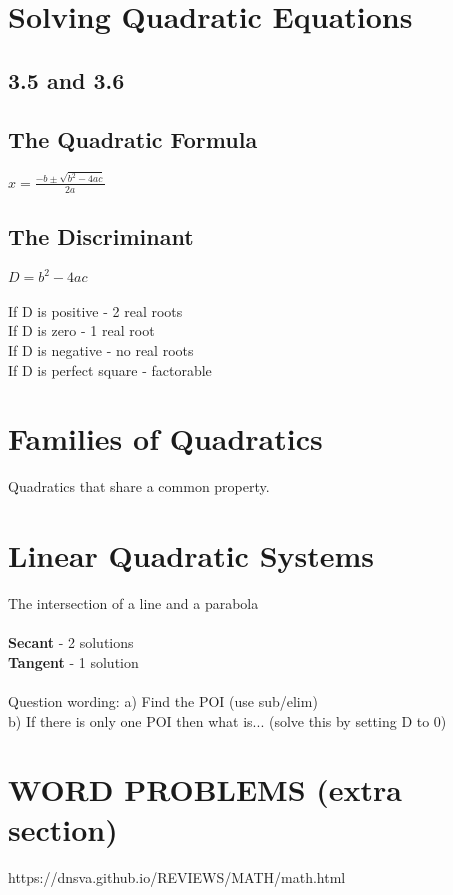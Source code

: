 \documentclass{article}
\begin{document}

\section{Solving Quadratic Equations}

\subsection*{3.5 and 3.6}

\subsection*{The Quadratic Formula}
$x=\frac{-b\pm\sqrt{b^2-4ac}}{2a}$

\subsection*{The Discriminant}
$D = b^2-4ac$\\\\
\noindent
If D is positive - 2 real roots\\
If D is zero - 1 real root\\
If D is negative - no real roots\\
If D is perfect square - factorable\\



\section{Families of Quadratics}
Quadratics that share a common property.


\section{Linear Quadratic Systems}
The intersection of a line and a parabola\\\\

\textbf{Secant} - 2 solutions\\
\textbf{Tangent} - 1 solution\\\\

Question wording: 
a) Find the POI (use sub/elim)\\
b) If there is only one POI then what is... (solve this by setting D to 0)\\

\section{WORD PROBLEMS (extra section)}

https://dnsva.github.io/REVIEWS/MATH/math.html


\end{document}
